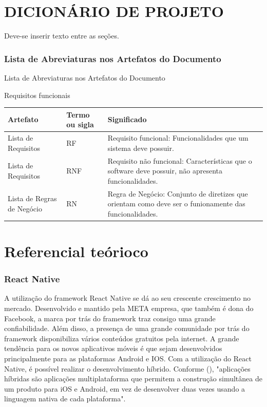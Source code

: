 \chapter{DICIONÁRIO DE PROJETO}\label{cap:desenvolvimento}
Deve-se inserir texto entre as seções.
\subsection{Lista de Abreviaturas nos Artefatos do Documento}
Lista de Abreviaturas nos Artefatos do Documento
\begin{quadro}[htb]
	\centering
	\caption{\label{Formatação do texto.}Requisitos funcionais}	
	\begin{tabular}{|p{4cm}|m{3cm}|p{7cm}|}
		\hline
		\textbf{Artefato} & \textbf{Termo ou sigla} & \textbf{Significado} \\ \hline
		Lista de Requisitos & RF & Requisito funcional: Funcionalidades que um sistema deve possuir. \\ \hline
		Lista de Requisitos & RNF & Requisito não funcional: Características que o software deve possuir, não apresenta funcionalidades. \\ \hline
		Lista de Regras de Negócio & RN & Regra de Negócio: Conjunto de diretizes que orientam como deve ser o funionamente das funcionalidades. \\ \hline
	\end{tabular}
\end{quadro}


\chapter{Referencial teórioco}\label{cap:desenvolvimento}

\subsection{React Native}
A utilização do framework React Native se dá ao seu crescente crescimento no mercado. Desenvolvido e mantido pela META empresa, que também é dona do Facebook,
a marca por trás do framework traz consigo uma grande confiabilidade. Além disso, a presença de uma grande comunidade por trás do framework disponibiliza vários conteúdos gratuitos pela internet.
A grande tendência para os novos aplicativos móveis é que sejam desenvolvidos principalmente para as plataformas Android e IOS. Com a utilização do React Native, 
é possível realizar o desenvolvimento híbrido. Conforme (\textcite{Sabino}), "aplicações híbridas são aplicações multiplataforma que permitem a construção 
simultânea de um produto para iOS e Android, em vez de desenvolver duas vezes usando a linguagem nativa de cada plataforma".

